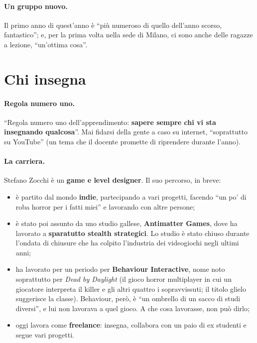 \paragraph{Un gruppo nuovo.} Il primo anno di quest'anno è ``più numeroso di
quello dell'anno scorso, fantastico''; e, per la prima volta nella sede di
Milano, ci sono anche delle ragazze a lezione, ``un'ottima cosa''.

\section{Chi insegna}
\label{gd8:sec:docente}



\paragraph{Regola numero uno.} ``Regola numero uno dell'apprendimento:
\textbf{sapere sempre chi vi sta insegnando qualcosa}''. Mai fidarsi della
gente a caso su internet, ``soprattutto su YouTube'' (un tema che il docente
promette di riprendere durante l'anno).

\paragraph{La carriera.} Stefano Zocchi è un \textbf{game e level designer}.
Il suo percorso, in breve:
\begin{itemize}
  \item è partito dal mondo \textbf{indie}, partecipando a vari progetti,
        facendo ``un po' di roba horror per i fatti miei'' e lavorando con
        altre persone;
  \item è stato poi assunto da uno studio gallese, \textbf{Antimatter
        Games}, dove ha lavorato a \textbf{sparatutto stealth strategici}.
        Lo studio è stato chiuso durante l'ondata di chiusure che ha colpito
        l'industria dei videogiochi negli ultimi anni;
  \item ha lavorato per un periodo per \textbf{Behaviour Interactive}, nome
        noto soprattutto per \emph{Dead by Daylight} (il gioco horror
        multiplayer in cui un giocatore interpreta il killer e gli altri
        quattro i sopravvissuti; il titolo glielo suggerisce la classe).
        Behaviour, però, è ``un ombrello di un sacco di studi diversi'', e
        lui non lavorava a quel gioco. A che cosa lavorasse, non può dirlo;
  \item oggi lavora come \textbf{freelance}: insegna, collabora con un paio
        di ex studenti e segue vari progetti.
\end{itemize}

